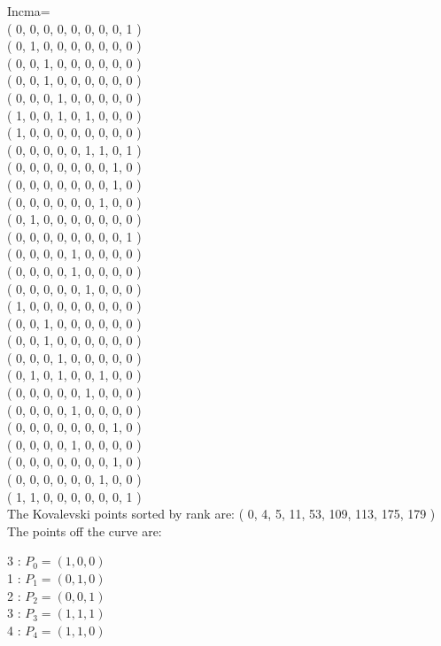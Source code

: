 \documentclass{article}
\begin{document}
{Incma=\\
( 0, 0, 0, 0, 0, 0, 0, 0, 1 )\\
( 0, 1, 0, 0, 0, 0, 0, 0, 0 )\\
( 0, 0, 1, 0, 0, 0, 0, 0, 0 )\\
( 0, 0, 1, 0, 0, 0, 0, 0, 0 )\\
( 0, 0, 0, 1, 0, 0, 0, 0, 0 )\\
( 1, 0, 0, 1, 0, 1, 0, 0, 0 )\\
( 1, 0, 0, 0, 0, 0, 0, 0, 0 )\\
( 0, 0, 0, 0, 0, 1, 1, 0, 1 )\\
( 0, 0, 0, 0, 0, 0, 0, 1, 0 )\\
( 0, 0, 0, 0, 0, 0, 0, 1, 0 )\\
( 0, 0, 0, 0, 0, 0, 1, 0, 0 )\\
( 0, 1, 0, 0, 0, 0, 0, 0, 0 )\\
( 0, 0, 0, 0, 0, 0, 0, 0, 1 )\\
( 0, 0, 0, 0, 1, 0, 0, 0, 0 )\\
( 0, 0, 0, 0, 1, 0, 0, 0, 0 )\\
( 0, 0, 0, 0, 0, 1, 0, 0, 0 )\\
( 1, 0, 0, 0, 0, 0, 0, 0, 0 )\\
( 0, 0, 1, 0, 0, 0, 0, 0, 0 )\\
( 0, 0, 1, 0, 0, 0, 0, 0, 0 )\\
( 0, 0, 0, 1, 0, 0, 0, 0, 0 )\\
( 0, 1, 0, 1, 0, 0, 1, 0, 0 )\\
( 0, 0, 0, 0, 0, 1, 0, 0, 0 )\\
( 0, 0, 0, 0, 1, 0, 0, 0, 0 )\\
( 0, 0, 0, 0, 0, 0, 0, 1, 0 )\\
( 0, 0, 0, 0, 1, 0, 0, 0, 0 )\\
( 0, 0, 0, 0, 0, 0, 0, 1, 0 )\\
( 0, 0, 0, 0, 0, 0, 1, 0, 0 )\\
( 1, 1, 0, 0, 0, 0, 0, 0, 1 )\\
The Kovalevski points sorted by rank are: 
( 0, 4, 5, 11, 53, 109, 113, 175, 179 )\\
The points off the curve are: \\
\begin{multicols}{3}
 : $P_{0}=( 1, 0, 0 )$\\
1 : $P_{1}=( 0, 1, 0 )$\\
2 : $P_{2}=( 0, 0, 1 )$\\
3 : $P_{3}=( 1, 1, 1 )$\\
4 : $P_{4}=( 1, 1, 0 )$\\

\end{multicols}}
\end{document}
